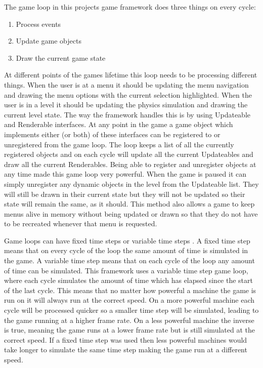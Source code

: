 \documentclass[]{report}
\begin{document}
			The game loop in this projects game framework does three things on every cycle:
			\begin{enumerate}
				\item Process events
				\item Update game objects
				\item Draw the current game state
			\end{enumerate}
			
			At different points of the games lifetime this loop needs to be processing different things. When the user is at a menu it should be updating the menu navigation and drawing the menu options with the current selection highlighted. When the user is in a level it should be updating the physics simulation and drawing the current level state. The way the framework handles this is by using Updateable and Renderable interfaces. At any point in the game a game object which implements either (or both) of these interfaces can be registered to or unregistered from the game loop. The loop keeps a list of all the currently registered objects and on each cycle will update all the current Updateables and draw all the current Renderables. Being able to register and unregister objects at any time made this game loop very powerful. When the game is paused it can simply unregister any dynamic objects in the level from the Updateable list. They will still be drawn in their current state but they will not be updated so their state will remain the same, as it should. This method also allows a game to keep menus alive in memory without being updated or drawn so that they do not have to be recreated whenever that menu is requested.
			
			Game loops can have fixed time steps or variable time steps \cite{gamepatterns}. A fixed time step means that on every cycle of the loop the same amount of time is simulated in the game. A variable time step means that on each cycle of the loop any amount of time can be simulated. This framework uses a variable time step game loop, where each cycle simulates the amount of time which has elapsed since the start of the last cycle. This means that no matter how powerful a machine the game is run on it will always run at the correct speed. On a more powerful machine each cycle will be processed quicker so a smaller time step will be simulated, leading to the game running at a higher frame rate. On a less powerful machine the inverse is true, meaning the game runs at a lower frame rate but is still simulated at the correct speed. If a fixed time step was used then less powerful machines would take longer to simulate the same time step making the game run at a different speed.
			
\end{document}
